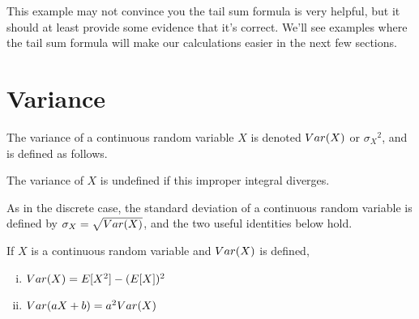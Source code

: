 This example may not convince you the tail sum formula is very helpful, but it should at least provide some evidence that it's correct. We'll see examples where the tail sum formula will make our calculations easier in the next few sections.


\section{Variance}\label{ContinuousVarianceSec}

\begin{defn}The variance of a continuous random variable $X$ is denoted $Var(X)$ or ${\sigma_X}^2$, and is defined as follows.
\par
\noindent The variance of $X$ is undefined if this improper integral diverges.
\end{defn}
\par
As in the discrete case, the standard deviation of a continuous random variable is defined by $\sigma_X = \sqrt{Var(X)}$, and the two useful identities below hold. 

\begin{prop}If $X$ is a continuous random variable and $Var(X)$ is defined,
\begin{enumerate}[(i)]
\item $Var(X) = E[X^2] -(E[X])^2$
\item $Var(aX+b) = a^2Var(X)$
\end{enumerate}
\end{prop}


